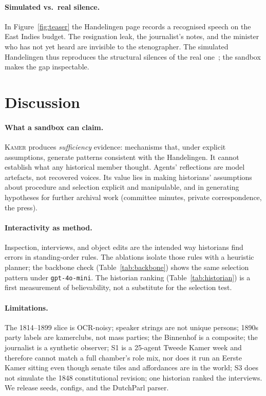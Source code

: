 \documentclass[sigconf,review,anonymous]{acmart}
\newcommand{\sys}{\textsc{Kamer}}
\begin{document}
\paragraph{Simulated vs.\ real silence.} In Figure~\ref{fig:teaser} the
Handelingen page records a recognised speech on the East Indies budget.
The resignation leak, the journalist's notes, and the minister who has
not yet heard are invisible to the stenographer. The simulated
Handelingen thus reproduces the structural silences of the real
one~\cite{trouillot1995silencing}; the sandbox makes the gap inspectable.

\section{Discussion}
\label{sec:discussion}

\paragraph{What a sandbox can claim.} \sys{} produces \emph{sufficiency}
evidence: mechanisms that, under explicit assumptions, generate patterns
consistent with the Handelingen. It cannot establish what any historical
member thought. Agents' reflections are model artefacts, not recovered
voices. Its value lies in making historians' assumptions about procedure
and selection explicit and manipulable, and in generating hypotheses for
further archival work (committee minutes, private correspondence, the
press).

\paragraph{Interactivity as method.} Inspection, interviews, and object
edits are the intended way historians find errors in standing-order rules.
The ablations isolate those rules with a heuristic planner; the
backbone check (Table~\ref{tab:backbone}) shows the same selection pattern
under \texttt{gpt-4o-mini}. The historian ranking
(Table~\ref{tab:historian}) is a first measurement of believability, not a
substitute for the selection test.

\paragraph{Limitations.} The 1814--1899 slice is OCR-noisy; speaker strings
are not unique persons; 1890s party labels are kamerclubs, not mass
parties; the Binnenhof is a composite; the journalist is a synthetic
observer; S1 is a 25-agent Tweede Kamer week and therefore cannot match a
full chamber's role mix, nor does it run an Eerste Kamer sitting even
though senate tiles and affordances are in the world; S3 does not
simulate the 1848 constitutional revision; one historian ranked the
interviews. We release seeds, configs, and the DutchParl parser.
\end{document}
